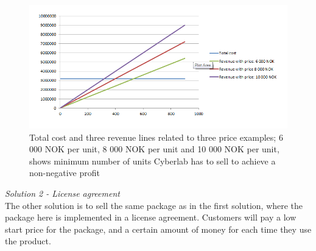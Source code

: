 \begin{figure}
\label{fig:RevenueStreamQuantity}
\begin{center}
\includegraphics[scale=0.7]{revenuestreamquantity}
\caption[Quantity examples]{Total cost and three revenue lines related to three price examples; 6 000 NOK per unit, 8 000 NOK per unit and 10 000 NOK per unit, shows minimum number of units Cyberlab has to sell to achieve a non-negative profit}
\end{center}
\end{figure}
\emph{Solution 2 - License agreement}\\
The other solution is to sell the same package as in the first solution, where the package here is implemented in a license agreement. Customers will pay a low start price for the package, and a certain amount of money for each time they use the product. \\ \\





